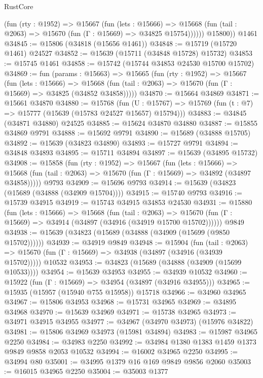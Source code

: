 \begin{lexlean}{RustCore}
\begin{coremodule}
            (fun (rty : @1952) =>
            @15667
              (fun (lets : @15666) =>
              @15668 (fun (tail : @2063) => @15670 (fun (Γ : @15669) => @34825 @15754))))))
        @15800))
    @1461
@34845 := @15806 (@34818 (@15656 @1461))
@34848 := @15719 (@15720 @1461) @24527
@34852 := @15639 (@15711 (@34848 @15728) @15732)
@34853 := @15745 @1461
@34858 := @15742 (@15744 @34853 @24530 @15700 @15702)
@34869 := fun (params : @15663) =>
  @15665
    (fun (rty : @1952) =>
    @15667
      (fun (lets : @15666) =>
      @15668 (fun (tail : @2063) => @15670 (fun (Γ : @15669) => @34825 (@34852 @34858)))))
@34870 := @15664 @34869
@34871 := @15661 @34870
@34880 := @15768
    (fun (U : @15767) => @15769 (fun (t : @7) => @15777 (@15639 (@15783 @24527 @15657) @15794)))
@34883 := @34845 (@34871 @34880) @24525
@34885 := @15624 @34870 @34880
@34887 := @15855 @34869 @9791
@34888 := @15692 @9791
@34890 := @15689 (@34888 @15705)
@34892 := @15639 (@34823 @34890)
@34893 := @15727 @9791
@34894 := @34848 @34893
@34895 := @15711 @34894
@34897 := @15639 (@34895 @15732)
@34908 := @15858
    (fun (rty : @1952) =>
    @15667
      (fun (lets : @15666) =>
      @15668 (fun (tail : @2063) => @15670 (fun (Γ : @15669) => @34892 (@34897 @34858)))))
    @9793
@34909 := @15696 @9793
@34914 := @15639 (@34823 (@15689 (@34888 (@34909 @15704))))
@34915 := @15740 @9793
@34916 := @15739 @34915
@34919 := @15743 @34915 @34853 @24530
@34931 := @15880
    (fun (lets : @15666) =>
    @15668
      (fun (tail : @2063) =>
      @15670 (fun (Γ : @15669) => @34914 (@34897 (@34916 (@34919 @15700 @15702))))))
    @9849
@34938 := @15639 (@34823 (@15689 (@34888 (@34909 (@15699 (@9850 @15702))))))
@34939 := @34919 @9849
@34948 := @15904
    (fun (tail : @2063) => @15670 (fun (Γ : @15669) => @34938 (@34897 (@34916 (@34939 @15702)))))
    @10532
@34953 := @34823 (@15689 (@34888 (@34909 (@15699 @10533))))
@34954 := @15639 @34953
@34955 := @34939 @10532
@34960 := @15922 (fun (Γ : @15669) => @34954 (@34897 (@34916 @34955)))
@34965 := @15935 (@15957 (@15940 @755 @15958)) @15718
@34966 := @34960 @34965
@34967 := @15806 @34953
@34968 := @15731 @34965
@34969 := @34895 @34968
@34970 := @15639 @34969
@34971 := @15738 @34965
@34973 := @34971 @34915 @34955
@34977 := @34967 (@34970 @34973) (@15976 @34822)
@34981 := @15806 @34969 @34973 (@15981 @34894)
@34983 := @15987 @34965 @2250
@34984 := @34983 @2250
@34992 := @34984 @1380 @1383 @1459 @1373 @9849 @9858 @2053 @10532
@34994 := @16002 @34965 @2250
@34995 := @34994 @80
@35001 := @34995 @1379 @16 @169 @9849 @9856 @2060
@35003 := @16015 @34965 @2250
@35004 := @35003 @1377

\end{coremodule}
\end{lexlean}
